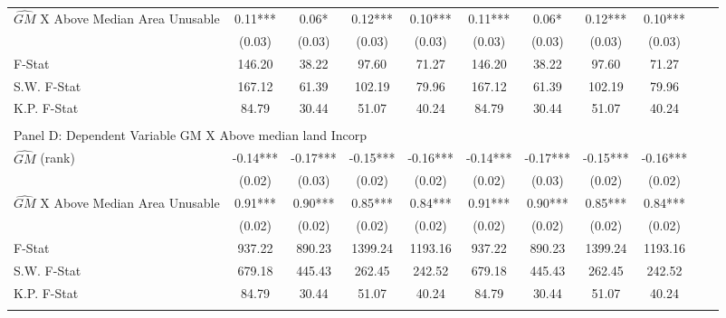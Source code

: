 \begin{table}[htbp]
\begin{threeparttable}
\begin{tabular}{l*{10}{c}}
\addlinespace
$\hat{GM}$ X Above Median Area Unusable&       0.11***&       0.06*  &       0.12***&       0.10***&       0.11***&       0.06*  &       0.12***&       0.10***\\
                &     (0.03)   &     (0.03)   &     (0.03)   &     (0.03)   &     (0.03)   &     (0.03)   &     (0.03)   &     (0.03)   \\
\midrule
F-Stat          &     146.20   &      38.22   &      97.60   &      71.27   &     146.20   &      38.22   &      97.60   &      71.27   \\
S.W. F-Stat     &     167.12   &      61.39   &     102.19   &      79.96   &     167.12   &      61.39   &     102.19   &      79.96   \\
K.P. F-Stat     &      84.79   &      30.44   &      51.07   &      40.24   &      84.79   &      30.44   &      51.07   &      40.24   \\
\cmidrule[\heavyrulewidth](lr){1-9} \\ \cmidrule[\heavyrulewidth](lr){1-9}
\multicolumn{8}{l}{Panel D: Dependent Variable GM X Above median land Incorp}\\
\cmidrule(lr){1-9}
$\hat{GM}$ (rank)&      -0.14***&      -0.17***&      -0.15***&      -0.16***&      -0.14***&      -0.17***&      -0.15***&      -0.16***\\
                &     (0.02)   &     (0.03)   &     (0.02)   &     (0.02)   &     (0.02)   &     (0.03)   &     (0.02)   &     (0.02)   \\
\addlinespace
$\hat{GM}$ X Above Median Area Unusable&       0.91***&       0.90***&       0.85***&       0.84***&       0.91***&       0.90***&       0.85***&       0.84***\\
                &     (0.02)   &     (0.02)   &     (0.02)   &     (0.02)   &     (0.02)   &     (0.02)   &     (0.02)   &     (0.02)   \\
\midrule
F-Stat          &     937.22   &     890.23   &    1399.24   &    1193.16   &     937.22   &     890.23   &    1399.24   &    1193.16   \\
S.W. F-Stat     &     679.18   &     445.43   &     262.45   &     242.52   &     679.18   &     445.43   &     262.45   &     242.52   \\
K.P. F-Stat     &      84.79   &      30.44   &      51.07   &      40.24   &      84.79   &      30.44   &      51.07   &      40.24   \\
\cmidrule[\heavyrulewidth](lr){1-9} \\ \cmidrule[\heavyrulewidth](lr){1-9}

\end{tabular}
\end{threeparttable}
\end{table}
